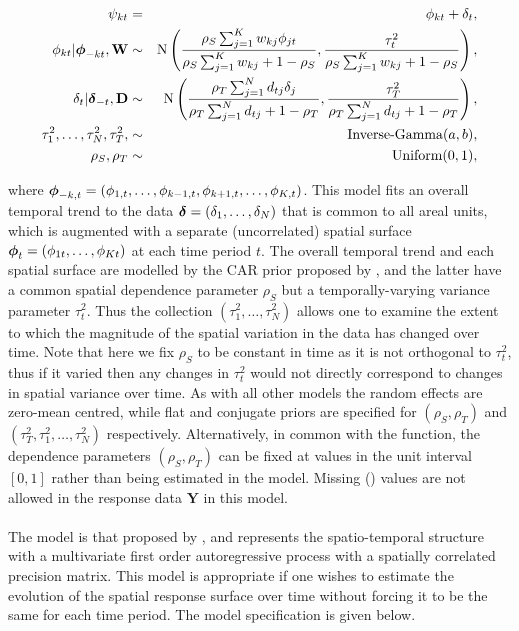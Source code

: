 \documentclass[article, nojss]{jss}
\newcommand{\bd}[1]{\ensuremath{\mbox{\boldmath $#1$}}}
\begin{document}
\begin{eqnarray}
\psi_{kt}&=&\phi_{kt} +  \delta_t,\label{carsepspat}\\
\phi_{kt}|\bd{\phi}_{-kt},\mathbf{W}&\sim&\mbox{N}\left(\frac{\rho_{S}\sum_{j=1}^Kw_{kj}\phi_{jt}}{\rho_{S}\sum_{j=1}^Kw_{kj} + 1-\rho_{S}}, \frac{\tau^2_{t}}{\rho_{S}\sum_{j=1}^Kw_{kj} + 1-\rho_{S}}\right),\nonumber\\
\delta_t|\bd{\delta}_{-t},\mathbf{D}&\sim&\mbox{N}\left(\frac{\rho_{T}\sum_{j=1}^N d_{tj}\delta_j}{\rho_{T}\sum_{j=1}^N d_{tj} + 1-\rho_{T}}, \frac{\tau^2_{T}}{\rho_{T}\sum_{j=1}^N d_{tj}+1-\rho_{T}}\right),\nonumber\\
\tau^2_{1},\ldots, \tau^2_{N}, \tau^2_{T}, &\sim&\mbox{Inverse-Gamma}(a,b),\nonumber\\
\rho_{S}, \rho_{T}&\sim&\mbox{Uniform}(0,1),\nonumber
\end{eqnarray}

where $\bd{\phi}_{-k,t}=(\phi_{1,t},\ldots,\phi_{k-1,t}, \phi_{k+1,t},\ldots,\phi_{K,t})$. This model fits an overall temporal trend to the data $\bd{\delta}=(\delta_1,\ldots,\delta_{N})$ that is common to all areal units, which is augmented with a separate (uncorrelated) spatial surface $\bd{\phi}_t=(\phi_{1t},\ldots, \phi_{Kt})$ at each time period $t$. The overall temporal trend and each spatial surface are modelled by the CAR prior proposed by \cite{leroux2000}, and the latter have a common spatial dependence parameter $\rho_S$ but a temporally-varying variance parameter $\tau^2_{t}$. Thus the collection $(\tau^2_{1},\ldots, \tau^2_{N})$ allows one to examine the extent to which the magnitude of the spatial variation in the data has changed over time. Note that here we fix $\rho_S$ to be constant in time as it is not orthogonal to $\tau^{2}_t$, thus if it varied then any changes in $\tau^{2}_t$ would not directly correspond to changes in spatial variance over time. As with all other models the random effects are zero-mean centred, while flat and conjugate priors are specified for $(\rho_S, \rho_T)$ and $(\tau^2_{T}, \tau^2_{1},\ldots, \tau^2_{N})$ respectively. Alternatively, in common with the  function, the  dependence parameters $(\rho_{S}, \rho_{T})$ can be fixed at values in the unit interval $[0,1]$ rather than being estimated in the model. Missing () values are not allowed in the response data $\mathbf{Y}$ in this model.\\




\\
The model is that proposed by \cite{rushworth2014}, and represents the spatio-temporal structure with a multivariate first order autoregressive process with a spatially correlated precision matrix. This model is appropriate if one wishes to estimate the  evolution of the spatial response surface over time without forcing it to be the same for each time period. The model specification is given below.
\end{document}
